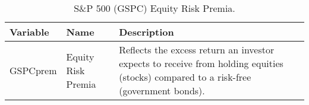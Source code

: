 \begin{table}[H]
  \centering
  \begin{tabular}{|l|l|p{7.5cm}|}
  \hline
  \textbf{Variable} & \textbf{Name} & \textbf{Description} \\
  \hline
  GSPCprem & Equity Risk Premia  & Reflects the excess return an investor expects to receive from holding equities (stocks) compared to a risk-free (government bonds). \\
  \hline
  \end{tabular}
  \caption{S\&P 500 (GSPC) Equity Risk Premia.}
  \label{tab:GSPC}
  \end{table}